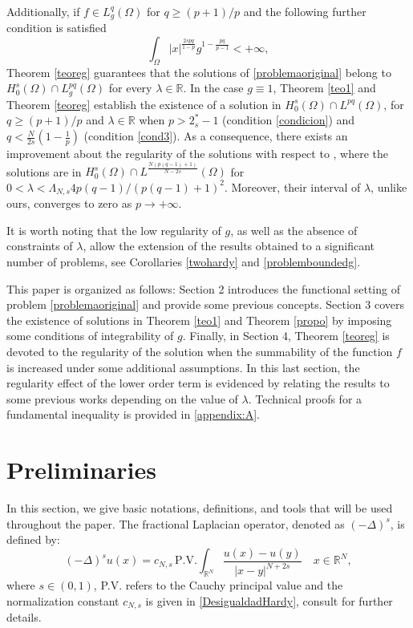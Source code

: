 \documentclass[preprint,12pt]{elsarticle}
\begin{document}
		Additionally, if  $f\in L^q_g(\Omega)$ for $q\geq (p+1)/p$ and the following further condition is satisfied
		\begin{equation}\label{cond3}
			\int_{\Omega} |x|^{\frac{2sp q}{1-p}}g^{1-\frac{p q}{p-1}}<+\infty,
		\end{equation}
		Theorem \ref{teoreg} guarantees that the solutions of \eqref{problemaoriginal} belong to $H^s_0(\Omega)\cap L_g^{pq}(\Omega)$ for every $\lambda\in\mathbb{R}$. In the case $g\equiv 1$, Theorem \ref{teo1} and Theorem \ref{teoreg} establish the existence of a solution in $H^s_0(\Omega)\cap L^{pq}(\Omega)$, for $q\geq (p+1)/p$ and $\lambda\in \mathbb{R}$ when $p>2^*_s-1$ (condition \eqref{condicion}) and $q<\frac{N}{2s}(1-\frac{1}{p})$ (condition \eqref{cond3}). As a consequence, there exists an improvement about the regularity of the solutions with respect to \cite[Theorem 1.5]{Mi}, where the solutions are in $H^s_0(\Omega)\cap L^{\frac{N(p(q-1)+1)}{N-2s}}(\Omega)$ for $0<\lambda<\Lambda_{N,s} 4p(q-1)/(p(q-1)+1)^2$. Moreover, their interval of $\lambda$, unlike ours, converges to zero as $p\rightarrow +\infty$.
		
		
		
		It is worth noting that the low regularity of $g$, as well as the absence of constraints of $\lambda$, allow the extension of the results obtained to a significant number of problems, see Corollaries \ref{twohardy} and \ref{problemboundedg}.
		
		This paper is organized as follows: Section 2 introduces the functional setting of problem \eqref{problemaoriginal} and provide some previous concepts. Section 3 covers the existence of solutions in  Theorem \ref{teo1} and Theorem \ref{propo} by imposing some conditions of integrability of $g$. Finally, in Section 4, Theorem \ref{teoreg} is devoted to the regularity of the solution when the summability of the function $f$ is increased under some additional assumptions. In this last section, the regularity effect of the lower order term is evidenced by relating the results to some previous works depending on the value of $\lambda$. Technical proofs for a fundamental inequality is provided in \ref{appendix:A}.
		
		\section{Preliminaries}
		In this section, we give basic notations, definitions, and tools that will be used
		throughout the paper. The fractional Laplacian operator, denoted as $(-\Delta)^s$, is defined by:
		\begin{equation*}
			(-\Delta)^su(x)=c_{N,s}\, \text{P.V.}\int_{\mathbb{R}^N} \frac{u(x)-u(y)}{|x-y|^{N+2s}} \quad x\in \mathbb{R}^N,
		\end{equation*}
		where $s\in(0,1)$, P.V. refers to the Cauchy principal value and the norma\-lization constant $c_{N,s}$ is given in \eqref{DesigualdadHardy}, consult \cite{DGV} for further details.
		
\end{document}
